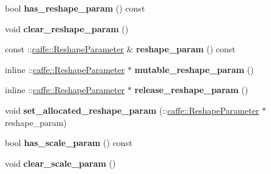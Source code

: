 \begin{DoxyCompactItemize}
\item 
\mbox{\label{classcaffe_1_1_layer_parameter_a9c1cee8569307735c597113b3c78de99}} 
bool {\bfseries has\+\_\+reshape\+\_\+param} () const
\item 
\mbox{\label{classcaffe_1_1_layer_parameter_a1ec30c5ddf7f7a5b64339b0015cf8d41}} 
void {\bfseries clear\+\_\+reshape\+\_\+param} ()
\item 
\mbox{\label{classcaffe_1_1_layer_parameter_a41710d85477c7541828e187c0fc6dd9f}} 
const \+::\mbox{\hyperlink{classcaffe_1_1_reshape_parameter}{caffe\+::\+Reshape\+Parameter}} \& {\bfseries reshape\+\_\+param} () const
\item 
\mbox{\label{classcaffe_1_1_layer_parameter_ad9b428db35743e80ea46014a3cdef41c}} 
inline \+::\mbox{\hyperlink{classcaffe_1_1_reshape_parameter}{caffe\+::\+Reshape\+Parameter}} $\ast$ {\bfseries mutable\+\_\+reshape\+\_\+param} ()
\item 
\mbox{\label{classcaffe_1_1_layer_parameter_aa5d3664a873876f1192015349c5aef51}} 
inline \+::\mbox{\hyperlink{classcaffe_1_1_reshape_parameter}{caffe\+::\+Reshape\+Parameter}} $\ast$ {\bfseries release\+\_\+reshape\+\_\+param} ()
\item 
\mbox{\label{classcaffe_1_1_layer_parameter_ae1b4e1260ef6c729a99cc1e2e365a1da}} 
void {\bfseries set\+\_\+allocated\+\_\+reshape\+\_\+param} (\+::\mbox{\hyperlink{classcaffe_1_1_reshape_parameter}{caffe\+::\+Reshape\+Parameter}} $\ast$reshape\+\_\+param)
\item 
\mbox{\label{classcaffe_1_1_layer_parameter_af3750ff2f63f24a2a332e3841cb45407}} 
bool {\bfseries has\+\_\+scale\+\_\+param} () const
\item 
\mbox{\label{classcaffe_1_1_layer_parameter_acedd7220b35cd01d9113d4570483a543}} 
void {\bfseries clear\+\_\+scale\+\_\+param} ()
\item 
\mbox{\label{classcaffe_1_1_layer_parameter_a435b22112edd1009aa2c91d354ab996c}} 

\end{DoxyCompactItemize}
